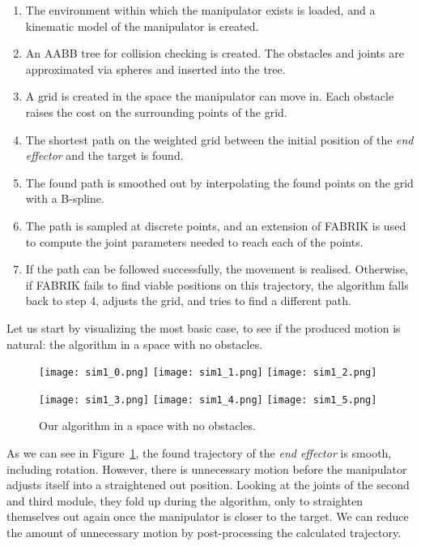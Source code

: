 \begin{enumerate}
\item The environment within which the manipulator exists is loaded, and a kinematic model of the manipulator is created.
\item An AABB tree for collision checking is created. The obstacles and joints are approximated via spheres and inserted into the tree.
\item A grid is created in the space the manipulator can move in. Each obstacle raises the cost on the surrounding points of the grid.
\item The shortest path on the weighted grid between the initial position of the \textit{end effector} and the target is found.
\item The found path is smoothed out by interpolating the found points on the grid with a B-spline.
\item The path is sampled at discrete points, and an extension of FABRIK is used to compute the joint parameters needed to reach each of the points.
\item If the path can be followed successfully, the movement is realised. Otherwise, if FABRIK fails to find viable positions on this trajectory, the algorithm falls back to step 4, adjusts the grid, and tries to find a different path.
\end{enumerate}

Let us start by visualizing the most basic case, to see if the produced motion is natural: the algorithm in a space with no obstacles.

\begin{figure}
  \centering
  \begin{minipage}{\textwidth}
    \texttt{[image: sim1\_0.png]}
    \texttt{[image: sim1\_1.png]}
    \texttt{[image: sim1\_2.png]}

    \texttt{[image: sim1\_3.png]}
    \texttt{[image: sim1\_4.png]}
    \texttt{[image: sim1\_5.png]}
  \end{minipage}
  \caption{Our algorithm in a space with no obstacles.}\label{fig:sim1}
\end{figure}

As we can see in Figure~\ref{fig:sim1}, the found trajectory of the \textit{end effector} is smooth, including rotation. However, there is unnecessary motion before the manipulator adjusts itself into a straightened out position. Looking at the joints of the second and third module, they fold up during the algorithm, only to straighten themselves out again once the manipulator is closer to the target. We can reduce the amount of unnecessary motion by post-processing the calculated trajectory.

